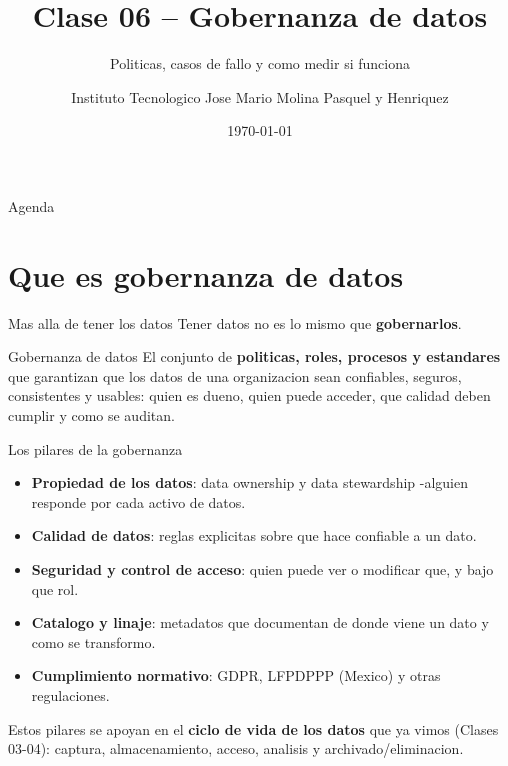 \documentclass[aspectratio=169]{beamer}
\title{Clase 06 -- Gobernanza de datos}
\subtitle{Politicas, casos de fallo y como medir si funciona}
\author{Instituto Tecnologico Jose Mario Molina Pasquel y Henriquez}
\date{\today}
\begin{document}
\begin{frame}[plain]
  \titlepage
\end{frame}

\begin{frame}{Agenda}
  \tableofcontents
\end{frame}

\section{Que es gobernanza de datos}

\begin{frame}{Mas alla de tener los datos}
  Tener datos no es lo mismo que \textbf{gobernarlos}.
  \begin{block}{Gobernanza de datos}
    El conjunto de \textbf{politicas, roles, procesos y estandares} que
    garantizan que los datos de una organizacion sean confiables, seguros,
    consistentes y usables: quien es dueno, quien puede acceder, que calidad
    deben cumplir y como se auditan.
  \end{block}
\end{frame}

\begin{frame}{Los pilares de la gobernanza}
  \begin{itemize}
    \item \textbf{Propiedad de los datos}: data ownership y data stewardship
          -alguien responde por cada activo de datos.
    \item \textbf{Calidad de datos}: reglas explicitas sobre que hace
          confiable a un dato.
    \item \textbf{Seguridad y control de acceso}: quien puede ver o modificar
          que, y bajo que rol.
    \item \textbf{Catalogo y linaje}: metadatos que documentan de donde viene
          un dato y como se transformo.
    \item \textbf{Cumplimiento normativo}: GDPR, LFPDPPP (Mexico) y otras
          regulaciones.
  \end{itemize}
  \vspace{0.2em}
  Estos pilares se apoyan en el \textbf{ciclo de vida de los datos} que ya
  vimos (Clases 03-04): captura, almacenamiento, acceso, analisis y
  archivado/eliminacion.
\end{frame}
\end{document}
